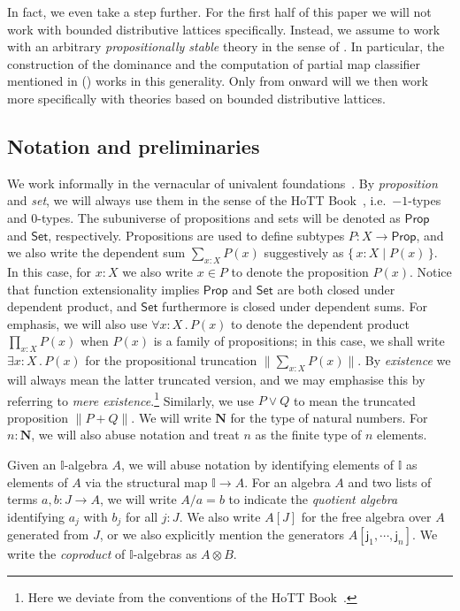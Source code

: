 \documentclass[a4paper,12pt]{amsart}
\theoremstyle{definition}
\newcommand{\mb}[1]{\mathbf{#1}}
\newcommand{\mbb}[1]{\mathbb{#1}}
\newcommand{\I}{\mbb I}
\newcommand{\ms}[1]{\mathsf{#1}}
\newcommand{\scomp}[2]{\{\,#1\mid#2\,\}}
\newcommand{\N}{\mb N}
\newcommand{\fa}[2]{\forall #1\!\colon\!\!#2\mathpunct{.}}
\newcommand{\ex}[2]{\exists #1\!\colon\!\!#2\mathpunct{.}}
\newcommand{\pss}[1]{\lVert #1\rVert} %
\newcommand{\pp}{\ms{Prop}}
\newcommand{\st}{\ms{Set}}
\begin{document}
In fact, we even take a step further. For the first half of this paper we will not work with bounded distributive lattices specifically. Instead, we assume to work with an arbitrary \emph{propositionally stable} theory in the sense of . In particular, the construction of the dominance and the computation of partial map classifier mentioned in  () works in this generality. Only from  onward will we then work more specifically with theories based on bounded distributive lattices.

\subsection*{Notation and preliminaries}
We work informally in the vernacular of univalent foundations~\citep{hottbook}.
By \emph{proposition} and \emph{set}, we will always use them in the sense of the HoTT Book~\citep{hottbook}, i.e.\ $-1$-types and $0$-types. The subuniverse of propositions and sets will be denoted as $\pp$ and $\st$, respectively. Propositions are used to define subtypes $P \colon X \to \pp$, and we also write the dependent sum $\sum_{x:X}P(x)$ suggestively as $\scomp{x:X}{P(x)}$. In this case, for $x:X$ we also write $x\in P$ to denote the proposition $P(x)$. Notice that function extensionality implies $\pp$ and $\st$ are both closed under dependent product, and $\st$ furthermore is closed under dependent sums. For emphasis, we will also use $\fa xXP(x)$ to denote the dependent product $\prod_{x:X}P(x)$ when $P(x)$ is a family of propositions; in this case, we shall write $\ex xXP(x)$ for the propositional truncation $\pss{\sum_{x:X}P(x)}$. By \emph{existence} we will always mean the latter truncated version, and we may emphasise this by referring to \emph{mere existence}.\footnote{Here we deviate from the conventions of the HoTT Book~\citep{hottbook}.} Similarly, we use $P \vee Q$ to mean the truncated proposition $\pss{P + Q}$. We will write $\N$ for the type of natural numbers. For $n:\N$, we will also abuse notation and treat $n$ as the finite type of $n$ elements. 

Given an $\I$-algebra $A$, we will abuse notation by identifying elements of $\I$ as elements of $A$ via the structural map $\I \to A$. For an algebra $A$ and two lists of terms $a,b \colon J \to A$, 
we will write $A/a = b$ to indicate the \emph{quotient algebra} identifying $a_j$ with $b_j$ for all $j : J$. We also write $A[J]$ for the free algebra over $A$ generated from $J$, or we also explicitly mention the generators $A[\ms{j}_1,\cdots,\ms{j}_n]$. We write the \emph{coproduct} of $\I$-algebras as $A \otimes B$.
\end{document}
